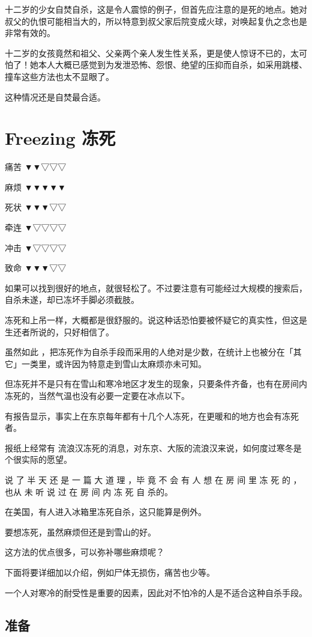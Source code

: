 \documentclass[UTF8]{ctexart}
\begin{document}
十二岁的少女自焚自杀，这是令人震惊的例子，但首先应注意的是死的地点。她对叔父的仇恨可能相当大的，所以特意到叔父家后院变成火球，对唤起复仇之念也是非常有效的。

十二岁的女孩竟然和祖父、父亲两个亲人发生性关系，更是使人惊讶不已的，太可怕了！她本人大概已感觉到为发泄恐怖、怨恨、绝望的压抑而自杀，如采用跳楼、撞车这些方法也太不显眼了。

这种情况还是自焚最合适。



\newpage

\section{Freezing 冻死}

痛苦 ▼▼▽▽▽

麻烦 ▼▼▼▼▼

死状 ▼▼▼▽▽

牵连 ▼▽▽▽▽

冲击 ▼▽▽▽▽

致命 ▼▼▼▽▽

如果可以找到很好的地点，就很轻松了。不过要注意有可能经过大规模的搜索后，自杀未遂，却已冻坏手脚必须截肢。

冻死和上吊一样，大概都是很舒服的。说这种话恐怕要被怀疑它的真实性，但这是生还者所说的，只好相信了。

虽然如此 ，把冻死作为自杀手段而采用的人绝对是少数，在统计上也被分在「其它」一类里，或许因为特意走到雪山太麻烦亦未可知。

但冻死并不是只有在雪山和寒冷地区才发生的现象，只要条件齐备，也有在房间内冻死的，当然气温也没有必要一定要在冰点以下。

有报告显示，事实上在东京每年都有十几个人冻死，在更暖和的地方也会有冻死者。

报纸上经常有 流浪汉冻死的消息，对东京、大阪的流浪汉来说，如何度过寒冬是个很实际的愿望。

说 了 半 天 还 是 一 篇 大 道 理 ，毕 竟 不 会 有 人 想 在 房 间 里 冻 死 的 ，也从 未 听 说 过 在 房 间 内 冻 死 自 杀的。

在美国，有人进入冰箱里冻死自杀，这只能算是例外。

要想冻死，虽然麻烦但还是到雪山的好。

这方法的优点很多，可以弥补哪些麻烦呢？

下面将要详细加以介绍，例如尸体无损伤，痛苦也少等。

一个人对寒冷的耐受性是重要的因素，因此对不怕冷的人是不适合这种自杀手段。


\subsection{准备}
\end{document}
